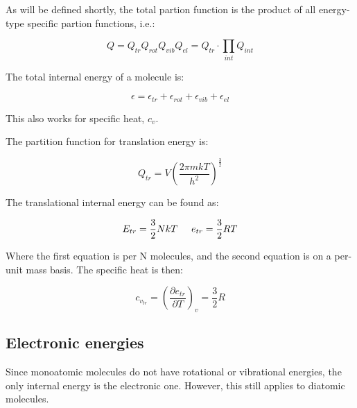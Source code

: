 \documentclass[10pt]{article}
\begin{document}
\begin{flushleft}
\begin{definition}
    As will be defined shortly, the total partion function is the product of all energy-type specific partion functions, i.e.:

    \begin{equation}
        Q = Q_{tr} Q_{rot} Q_{vib} Q_{el} = Q_{tr} \cdot \prod_{int} Q_{int}
    \end{equation}

    The total internal energy of a molecule is:

    \begin{equation}
        \epsilon = \epsilon_{tr} + \epsilon_{rot} + \epsilon_{vib} + \epsilon_{el}
    \end{equation}

    This also works for specific heat, $c_v$.
    
\end{definition}

\begin{definition}
The partition function for translation energy is:

\begin{equation}
    Q_{tr} = V \left( \frac{2 \pi m k T}{h^2} \right)^\frac{3}{2}
\end{equation}

The translational internal energy can be found as:

\begin{equation}
    E_{tr} = \frac{3}{2} NkT \hspace{5mm} e_{tr} = \frac{3}{2}R T
\end{equation}

Where the first equation is per N molecules, and the second equation is on a per-unit mass basis. The specific heat is then:

\begin{equation}
    c_{v_{tr}} = \left(\frac{\partial e_{tr}}{\partial T} \right)_{v} = \frac{3}{2} R
\end{equation}
    
\end{definition}

\subsection{Electronic energies}

Since monoatomic molecules do not have rotational or vibrational energies, the only internal energy is the electronic one. However, this still applies to diatomic molecules.


\end{flushleft}
\end{document}

